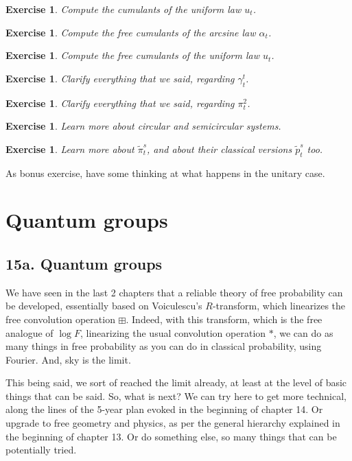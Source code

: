 \documentclass[12pt]{amsbook}
\newtheorem{exercise}[theorem]{Exercise}
\begin{document}
\begin{exercise}
Compute the cumulants of the uniform law $u_t$.
\end{exercise}

\begin{exercise}
Compute the free cumulants of the arcsine law $\alpha_t$.
\end{exercise}

\begin{exercise}
Compute the free cumulants of the uniform law $u_t$.
\end{exercise}

\begin{exercise}
Clarify everything that we said, regarding $\gamma_t^t$.
\end{exercise}

\begin{exercise}
Clarify everything that we said, regarding $\pi^2_t$.
\end{exercise}

\begin{exercise}
Learn more about circular and semicircular systems.
\end{exercise}

\begin{exercise}
Learn more about $\tilde{\pi}^s_t$, and about their classical versions $\tilde{p}^s_t$ too.
\end{exercise}

As bonus exercise, have some thinking at what happens in the unitary case.

\chapter{Quantum groups}

\section*{15a. Quantum groups}

We have seen in the last 2 chapters that a reliable theory of free probability can be developed, essentially based on Voiculescu's $R$-transform, which linearizes the free convolution operation $\boxplus$. Indeed, with this transform, which is the free analogue of $\log F$, linearizing the usual convolution operation $*$, we can do as many things in free probability as you can do in classical probability, using Fourier. And, sky is the limit.

\bigskip

This being said, we sort of reached the limit already, at least at the level of basic things that can be said. So, what is next? We can try here to get more technical, along the lines of the 5-year plan evoked in the beginning of chapter 14. Or upgrade to free geometry and physics, as per the general hierarchy explained in the beginning of chapter 13. Or do something else, so many things that can be potentially tried.
\end{document}
